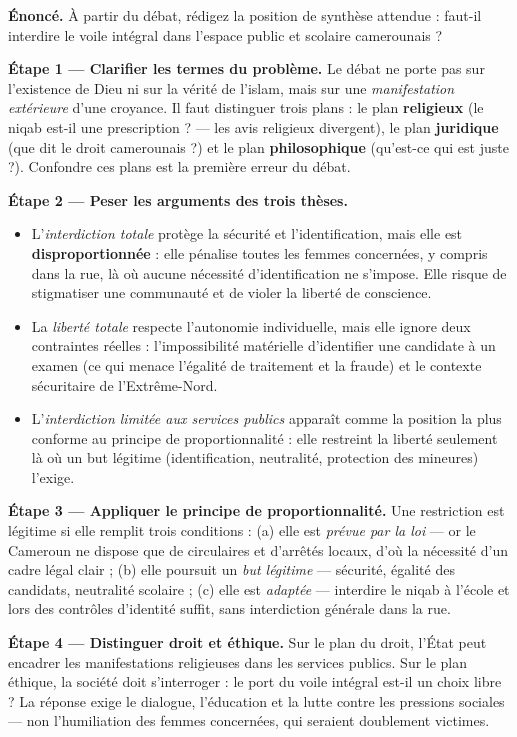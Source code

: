 \documentclass[11pt]{article}
\begin{document}
\begin{exoresolu}
\textbf{Énoncé.} À partir du débat, rédigez la position de synthèse attendue : faut-il interdire le voile intégral dans l'espace public et scolaire camerounais ?

\tcblower
\textbf{Étape 1 — Clarifier les termes du problème.} Le débat ne porte pas sur l'existence de Dieu ni sur la vérité de l'islam, mais sur une \emph{manifestation extérieure} d'une croyance. Il faut distinguer trois plans : le plan \textbf{religieux} (le niqab est-il une prescription ? — les avis religieux divergent), le plan \textbf{juridique} (que dit le droit camerounais ?) et le plan \textbf{philosophique} (qu'est-ce qui est juste ?). Confondre ces plans est la première erreur du débat.

\textbf{Étape 2 — Peser les arguments des trois thèses.}
\begin{itemize}
\item L'\emph{interdiction totale} protège la sécurité et l'identification, mais elle est \textbf{disproportionnée} : elle pénalise toutes les femmes concernées, y compris dans la rue, là où aucune nécessité d'identification ne s'impose. Elle risque de stigmatiser une communauté et de violer la liberté de conscience.
\item La \emph{liberté totale} respecte l'autonomie individuelle, mais elle ignore deux contraintes réelles : l'impossibilité matérielle d'identifier une candidate à un examen (ce qui menace l'égalité de traitement et la fraude) et le contexte sécuritaire de l'Extrême-Nord.
\item L'\emph{interdiction limitée aux services publics} apparaît comme la position la plus conforme au principe de proportionnalité : elle restreint la liberté seulement là où un but légitime (identification, neutralité, protection des mineures) l'exige.
\end{itemize}

\textbf{Étape 3 — Appliquer le principe de proportionnalité.} Une restriction est légitime si elle remplit trois conditions : (a) elle est \emph{prévue par la loi} — or le Cameroun ne dispose que de circulaires et d'arrêtés locaux, d'où la nécessité d'un cadre légal clair ; (b) elle poursuit un \emph{but légitime} — sécurité, égalité des candidats, neutralité scolaire ; (c) elle est \emph{adaptée} — interdire le niqab à l'école et lors des contrôles d'identité suffit, sans interdiction générale dans la rue.

\textbf{Étape 4 — Distinguer droit et éthique.} Sur le plan du droit, l'État peut encadrer les manifestations religieuses dans les services publics. Sur le plan éthique, la société doit s'interroger : le port du voile intégral est-il un choix libre ? La réponse exige le dialogue, l'éducation et la lutte contre les pressions sociales — non l'humiliation des femmes concernées, qui seraient doublement victimes.


\end{exoresolu}
\end{document}
